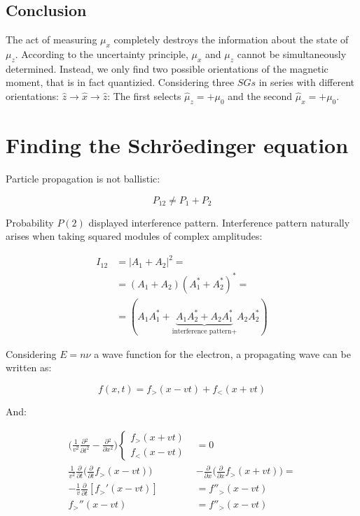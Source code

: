   \subsection{Conclusion}
  The act of measuring $\mu_x$ completely destroys the information about the state of $\mu_z$.
  According to the uncertainty principle, $\mu_x$ and $\mu_z$ cannot be simultaneously determined.
  Instead, we only find two possible orientations of the magnetic moment, that is in fact quantizied.
  Considering three $SGs$ in series with different orientations: $\hat{z}\rightarrow\hat{x}\rightarrow\hat{z}$:
  The first selects $\hat{\mu}_z = +\mu_0$ and the second $\hat{\mu}_x = +\mu_0$.

\section{Finding the Schr\"oedinger equation}
Particle propagation is not ballistic:

$$P_{12} \neq P_1 + P_2$$

Probability $P(2)$ displayed interference pattern.
Interference pattern naturally arises when taking squared modules of complex amplitudes:

\begin{align*}
  I_{12} &= |A_1 + A_2|^2=\\
         &=(A_1 + A_2)(A_1^*+A_2^*)^*=\\
         &=(A_1A_1^*+\underbrace{A_1A_2^*+A_2A_1^*}_{\text{interference pattern+}}A_2A_2^*)
\end{align*}


Considering $E=n\nu$ a wave function for the electron, a propagating wave can be written as:

$$f(x,t) = f_>(x-vt)+f_<(x+vt)$$

And:

\begin{align*}
  \biggl(\frac{1}{v^2}\frac{\partial {^2}}{\partial {t^2}}-\frac{\partial {^2}}{\partial {x^2}}\biggr)\begin{cases}f_>(x+vt)\\f_<(x-vt)\end{cases} &= 0\\
  \frac{1}{v^2}\frac{\partial {}}{\partial {t}}\biggl(\frac{\partial {}}{\partial {t}}f_>(x-vt)\biggr)&-\frac{\partial {}}{\partial {x}}\biggl(\frac{\partial {}}{\partial {x}}f_>(x+vt)\biggr)=\\
  -\frac{1}{v}\frac{\partial {}}{\partial {t}}[f_>'(x-vt)]&=f''_>(x-vt)\\
  f_>''(x-vt) &=f''_>(x-vt)
\end{align*}

